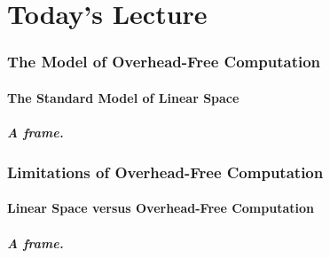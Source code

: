 \documentclass{beamer}
\begin{document}
\part{Today's Lecture}

\frame{\partpage}


\section[Models]{The Model of Overhead-Free Computation}



\subsection[Standard Model]{The Standard Model of Linear Space}

\frame
{
  \frametitle{A frame.}
}


\section[Limitations]{Limitations of Overhead-Free Computation}



\subsection[Linear Space]{Linear Space versus Overhead-Free Computation}

\frame
{
  \frametitle{A frame.}
}
\end{document}
